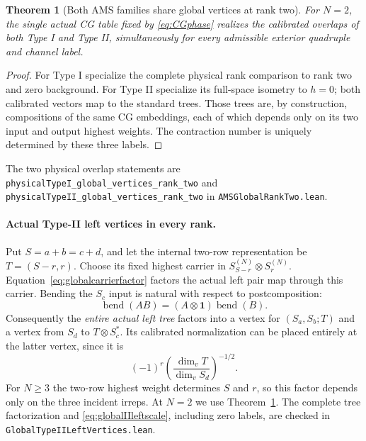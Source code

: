 \documentclass[10pt,a4paper]{article}
\newtheorem{theorem}{Theorem}
\newcommand{\id}{\mathbf 1}
\newcommand{\lean}[1]{{\small\nolinkurl{#1}}}
\newenvironment{revision}{\begingroup}{\endgroup}
\begin{document}
\begin{revision}
\begin{theorem}[Both AMS families share global vertices at rank two]
\label{thm:globalranktwo}
For $N=2$, the single actual CG table fixed by \eqref{eq:CGphase} realizes
the calibrated overlaps of both Type I and Type II, simultaneously for
every admissible exterior quadruple and channel label.
\end{theorem}
\begin{proof}
For Type I specialize the complete physical rank comparison to rank two
and zero background. For Type II specialize its full-space isometry to
$h=0$; both calibrated vectors map to the standard trees. Those trees
are, by construction, compositions of the same CG embeddings, each of
which depends only on its two input and output highest weights. The
contraction number is uniquely determined by these three labels.
\end{proof}
The two physical overlap statements are
\lean{physicalTypeI_global_vertices_rank_two} and
\lean{physicalTypeII_global_vertices_rank_two} in
\lean{AMSGlobalRankTwo.lean}.

\paragraph{Actual Type-II left vertices in every rank.}
Put $S=a+b=c+d$, and let the internal two-row representation be
$T=(S-r,r)$. Choose its fixed highest carrier in
$S_{S-r}^{(N)}\otimes S_r^{(N)}$.
Equation~\eqref{eq:globalcarrierfactor} factors the actual left pair
map through this carrier. Bending the $S_c$ input is natural with
respect to postcomposition:
\[
 \operatorname{bend}(AB)
   =(A\otimes\id)\operatorname{bend}(B).
\]
Consequently the \emph{entire actual left tree} factors into a vertex
for $(S_a,S_b;T)$ and a vertex from $S_d$ to $T\otimes S_c^*$.
Its calibrated normalization can be placed entirely at the latter
vertex, since it is
\begin{equation}\label{eq:globalIIleftscale}
 (-1)^r\left(\frac{\dim_v T}{\dim_v S_d}\right)^{-1/2}.
\end{equation}
For $N\ge3$ the two-row highest weight determines $S$ and $r$, so
this factor depends only on the three incident irreps. At $N=2$ we use
Theorem~\ref{thm:globalranktwo}. The complete tree factorization and
\eqref{eq:globalIIleftscale}, including zero labels, are checked in
\lean{GlobalTypeIILeftVertices.lean}.


\end{revision}
\end{document}
